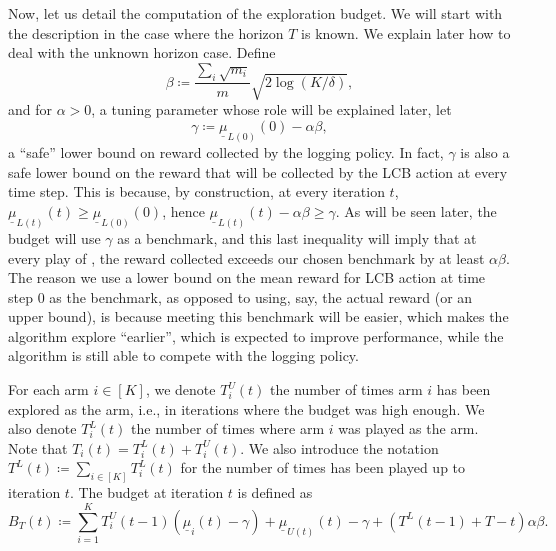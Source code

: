 Now, let us detail the computation of the exploration budget. We will start with the description in the case where the horizon $T$ is known. We explain later how to deal with the unknown horizon case.  Define
\[
\beta\coloneq\frac{\sum_i \sqrt{m_i}}{m}\sqrt{2\log(K/\delta)},
\]
and for $\alpha>0$, a tuning parameter whose role will be explained later, let
\[
\gamma\coloneq \underline{\mu}_{L(0)}(0)-\alpha\beta,
\]
a ``safe'' lower bound on reward collected by the logging policy. In fact, $\gamma$ is also a safe lower bound on the reward that will be collected by the LCB action at every time step. This is because,
by construction, at every iteration $t$, $\underline{\mu}_{L(t)}(t)\geq \underline{\mu}_{L(0)}(0)$, hence $\underline{\mu}_{L(t)}(t)-\alpha\beta \geq \gamma$. As will be seen later, the budget will use $\gamma$ as a benchmark, and this last inequality will imply that at every play of \alglcb, the reward collected exceeds our chosen benchmark by at least $\alpha \beta$. %
The reason we use a lower bound on the mean reward for LCB action at time step $0$ as the benchmark, as opposed to using, say, the actual reward (or an upper bound), is because meeting this benchmark will be easier, which makes the algorithm explore ``earlier'', which is expected to improve performance, while the algorithm is still able to compete with the logging policy.


For each arm $i \in [K]$, we denote $T_i^U(t)$ the number of times arm $i$ has been explored as the \algucb arm, i.e., in iterations where the budget was high enough. We also denote  $T^L_i(t)$ the number of times where arm $i$ was played as the \alglcb arm. Note that $T_i(t)=T^L_i(t)+T_i^U(t)$. We also introduce the notation $T^L(t)\coloneq\sum_{i \in [K]}T_i^L(t)$ for the number of times \alglcb has been played up to iteration $t$. The budget at iteration $t$ is defined as
\begin{equation}\label{eq:budget}
B_{T}(t)\coloneq \sum_{i=1}^{K}T_i^U(t-1)(\underline{\mu}_i(t)-\gamma)+\underline{\mu}_{U(t)}(t)-\gamma+(T^L(t-1)+T-t)\alpha \beta.   
\end{equation}

